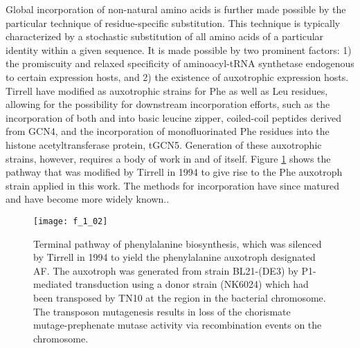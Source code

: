 \begin{refsection}
Global incorporation of non-natural amino acids is further made possible by the
particular technique of residue-specific substitution. This technique is
typically characterized by a stochastic substitution of all amino acids of a
particular identity within a given sequence. It is made possible by two
prominent factors: 1) the promiscuity and relaxed specificity of aminoacyl-tRNA
synthetase endogenous to certain expression hosts, and 2) the existence of
auxotrophic expression hosts. Tirrell  have modified  as auxotrophic strains for Phe as well as Leu residues, allowing for the
possibility for downstream incorporation efforts, such as the incorporation of
both  and
 into basic leucine zipper, coiled-coil
peptides derived from GCN4,\cite{Son2006} and the incorporation of monofluorinated Phe
residues into the histone acetyltransferase protein,
tGCN5.\cite{Voloshchuk2009} Generation of these auxotrophic strains, however,
requires a body of work in and of itself.\cite{Yoshikawa1994,Son2006} Figure
\ref{fig:chorismate_pathway} shows the pathway that was modified by Tirrell
 in 1994 to give rise to the Phe auxotroph strain applied in this
work. The methods for incorporation have since matured and have become more
widely known.\cite{Hammill2007}.
\begin{figure}[h!] \centering \texttt{[image: f\_1\_02]}
    \caption[Terminal pathway
        of phenylalanine biosynthesis, which was silenced by
        Tirrell  in 1994 to yield the phenylalanine auxotroph
        designated AF. The auxotroph was generated from
         strain BL21-(DE3) by P1-mediated transduction using a
        donor strain (NK6024) which had been transposed by TN10 at the
         region in the bacterial chromosome.  The transposon
        mutagenesis results in loss of the chorismate mutage-prephenate mutase
        activity via recombination events on the
chromosome.]{Terminal pathway
        of phenylalanine biosynthesis,\cite{Im1971} which was silenced by
        Tirrell  in 1994 to yield the phenylalanine auxotroph
        designated AF.\cite{Yoshikawa1994} The auxotroph was generated from
         strain BL21-(DE3) by P1-mediated transduction using a
        donor strain (NK6024) which had been transposed by TN10 at the
         region in the bacterial chromosome.  The transposon
        mutagenesis results in loss of the chorismate mutage-prephenate mutase
        activity via recombination events on the
chromosome.}\label{fig:chorismate_pathway} \end{figure}

\end{refsection}

